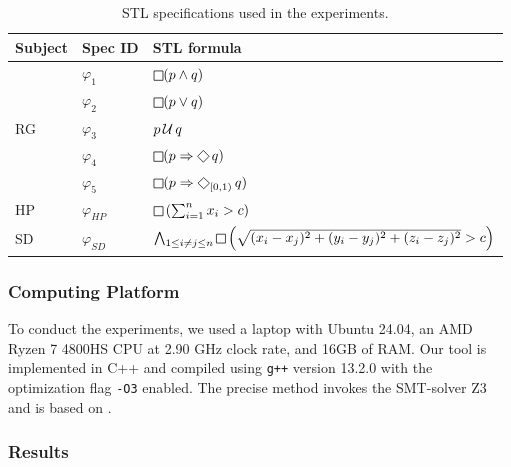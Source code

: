 \begin{table}
\centering
\begin{tabular}{|l|l|l|}
\hline
Subject & Spec ID & STL formula \\
\hline
\multirow{ 5}{*}{RG}
& $\varphi_1$ & $\LTLg (p \wedge q)$  \\
& $\varphi_2$ & $\LTLg (p \vee q)$ \\
& $\varphi_3$ & $ p \operatorname{\mathcal{U}} q$ \\
& $\varphi_4$ & $\LTLg (p \Rightarrow \LTLf q)$ \\
& $\varphi_5$ & $\LTLg (p \Rightarrow \LTLf_{[0,1)} q)$  \\
\hline
HP & $\varphi_{HP}$ & $\LTLg \left(\sum_{i=1}^{n} x_i  > c\right)$  \\
SD & $\varphi_{SD}$ & $\bigwedge_{1 \leq i \neq j \leq n} \LTLg \left( \sqrt{(x_i-x_j)^2 + (y_i-y_j)^2 + (z_i-z_j)^2} > c \right)$   \\
\hline
\end{tabular}
\caption{STL specifications used in the experiments.}
\label{tab:spec} 
\end{table}

\subsubsection{Computing Platform}

To conduct the experiments, we used a laptop with Ubuntu 24.04, an AMD Ryzen 7 4800HS CPU at 2.90 GHz clock rate, and 16GB of RAM.
Our tool is implemented in C++ and compiled using \texttt{g++} version 13.2.0 with the optimization flag \texttt{-O3} enabled.
The precise method invokes the SMT-solver Z3 \cite{MouraB08} and is based on \cite{MomtazAB23}.

\subsubsection{Results}

